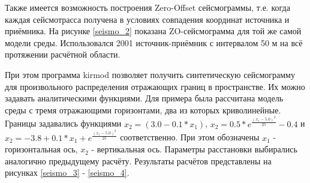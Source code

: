 \documentclass{article}
\begin{document}
Также имеется возможность построения Zero-Offset сейсмограммы, т.е. когда каждая сейсмотрасса получена в условиях совпадения координат источника и приёмника.
На рисунке \ref{seismo_2} показана ZO-сейсмограмма для той же самой модели среды.
Использовался 2001 источник-приёмник с интервалом 50 м на всё протяжении расчётной области.

\noindent
\begin{minipage}{\linewidth}
\label{seismo_2}
\end{minipage}

При этом программа kirmod позволяет получить синтетическую сейсмограмму для произвольного распределения отражающих границ в пространстве.
Их можно задавать аналитическими функциями.
Для примера была рассчитана модель среды с тремя отражающими горизонтами, два из которых криволинейные.
Границы задавались функциями $x_2 = (3.0 - 0.1 * x_1)$, $x_2 = 0.5 * e^{\frac{(x_1 - 5.0)^2}{25}} - 0.4$ и $x_2 = -3.8 + 0.1 * x_1 + e^{\frac{(x_1 - 5.0)^2}{25}}$ соответственно.
При этом обозначены $x_1$ - горизонтальная ось, $x_2$ - вертикальная ось.
Параметры расстановки выбирались аналогично предыдущему расчёту.
Результаты расчётов представлены на рисунках \ref{seismo_3} - \ref{seismo_4}.
\end{document}
